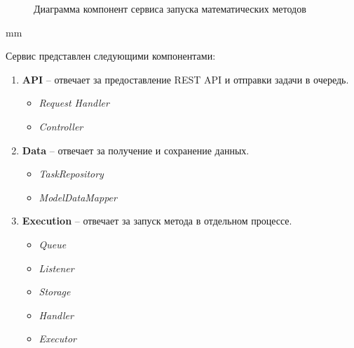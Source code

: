 \begin{figure}[H]
	\caption{Диаграмма компонент сервиса запуска математических методов}
	\label{pic:architecture__executor-component}
\end{figure}
 mm

Сервис представлен следующими компонентами:
\begin{enumerate}
	\item {
		\textbf{API} -- отвечает за предоставление REST API и отправки задачи в очередь.
		\begin{itemize}
			\item \textit{Request Handler}
			\item \textit{Controller}
		\end{itemize}
	}
	\item {
		\textbf{Data} -- отвечает за получение и сохранение данных.
		\begin{itemize}
			\item \textit{TaskRepository}
			\item \textit{ModelDataMapper}
		\end{itemize}
	}
	\item {
		\textbf{Execution} -- отвечает за запуск метода в отдельном процессе.
		\begin{itemize}
			\item \textit{Queue}
			\item \textit{Listener}
			\item \textit{Storage}
			\item \textit{Handler}
			\item \textit{Executor}
		\end{itemize}
	}
\end{enumerate}
